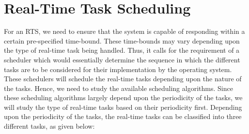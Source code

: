 \documentclass[12pt]{report}
\begin{document}
\chapter{Real-Time Task Scheduling}
For an RTS, we need to ensure that the system is capable of responding within a certain pre-specified time-bound. These time-bounds may vary depending upon the type of real-time task being handled. Thus, it calls for the requirement of a scheduler which would essentially determine the sequence in which the different tasks are to be considered for their implementation by the operating system. These schedulers will schedule the real-time tasks depending upon the nature of the tasks. Hence, we need to study the available scheduling algorithms. Since these scheduling algorithms largely depend upon the periodicity of the tasks, we will study the type of real-time tasks based on their periodicity first. Depending upon the periodicity of the tasks, the real-time tasks can be classified into three different tasks, as given below:
\end{document}
